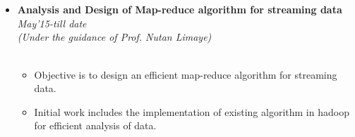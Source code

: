  \\[-1cm]\\
\begin{itemize}
	\item \textbf{Analysis and Design of Map-reduce algorithm for streaming data} \hfill {\emph{May'15-till date}} \\[-0.1cm] 
	\emph{(Under the guidance of Prof. Nutan Limaye)} \hfill \\[-1.1 cm]\\
	\begin{itemize}
		\item Objective is to design an efficient map-reduce algorithm for streaming data.
		\item Initial work includes the implementation of existing algorithm in hadoop for efficient analysis of data.\\[-1cm]\\
	\end{itemize}
\end{itemize}
